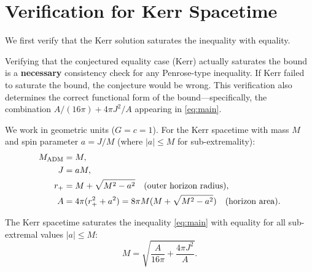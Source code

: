 \section{Verification for Kerr Spacetime}\label{sec:kerr}

We first verify that the Kerr solution saturates the inequality with equality.

\begin{remark}
Verifying that the conjectured equality case (Kerr) actually saturates the bound is a \textbf{necessary} consistency check for any Penrose-type inequality. If Kerr failed to saturate the bound, the conjecture would be wrong. This verification also determines the correct functional form of the bound---specifically, the combination $A/(16\pi) + 4\pi J^2/A$ appearing in \eqref{eq:main}.
\end{remark}

\begin{definition}\label{def:kerr-params}
We work in geometric units ($G=c=1$). For the Kerr spacetime with mass $M$ and spin parameter $a = J/M$ (where $|a| \leq M$ for sub-extremality):
\begin{align}
    M_{\mathrm{ADM}} &= M, \\
    J &= aM, \\
    r_+ &= M + \sqrt{M^2 - a^2} \quad \text{(outer horizon radius)}, \\
    A &= 4\pi(r_+^2 + a^2) = 8\pi M(M + \sqrt{M^2 - a^2}) \quad \text{(horizon area)}.
\end{align}
\end{definition}

\begin{theorem}\label{thm:kerr}
The Kerr spacetime saturates the inequality \eqref{eq:main} with equality for all sub-extremal values $|a| \leq M$:
\[
M = \sqrt{\frac{A}{16\pi} + \frac{4\pi J^2}{A}}.
\]
\end{theorem}


